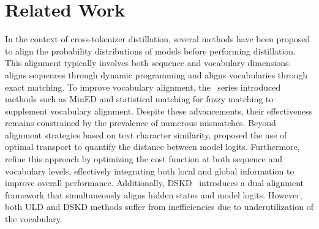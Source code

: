 \section{Related Work}
In the context of cross-tokenizer distillation, several methods have been proposed to align the probability distributions of models before performing distillation. This alignment typically involves both sequence and vocabulary dimensions.
~\citet{fu2023specializing} aligns sequences through dynamic programming and aligns vocabularies through exact matching. To improve vocabulary alignment, the~\cite{wanknowledge,wan2024fusechat} series introduced methods such as MinED and statistical matching for fuzzy matching to supplement vocabulary alignment.
Despite these advancements, their effectiveness remains constrained by the prevalence of numerous mismatches. Beyond alignment strategies based on text character similarity, \citet{boizard2024towards} proposed the use of optimal transport to quantify the distance between model logits. Furthermore, \citet{cui2024multi} refine this approach by optimizing the cost function at both sequence and vocabulary levels, effectively integrating both local and global information to improve overall performance. Additionally, DSKD~\cite{zhang2024dual} introduces a dual alignment framework that simultaneously aligns hidden states and model logits. However, both ULD and DSKD methods suffer from inefficiencies due to underutilization of the vocabulary.